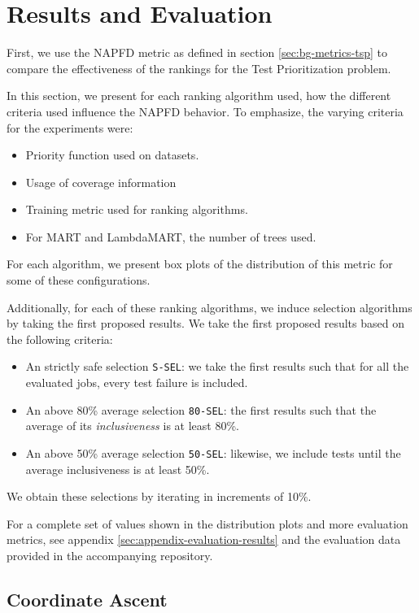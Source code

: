 \chapter{Results and Evaluation}\label{s:results}

First, we use the NAPFD metric as defined in section \ref{sec:bg-metrics-tsp} to compare the effectiveness of the 
rankings for the Test Prioritization problem.

In this section, we present for each ranking algorithm used, how the different criteria used influence the
NAPFD behavior. To emphasize, the varying criteria for the experiments were:
\begin{itemize}
    \item Priority function used on datasets.
    \item Usage of coverage information
    \item Training metric used for ranking algorithms.
    \item For MART and LambdaMART, the number of trees used.
\end{itemize}

For each algorithm, we present box plots of the distribution of this metric for some of these configurations. 

Additionally, for each of these ranking algorithms, we induce selection algorithms by taking the first proposed
results. We take the first proposed results based on the following criteria:
\begin{itemize}
    \item An strictly safe selection \texttt{S-SEL}: we take the first results such that for all the evaluated jobs, every 
    test failure is included.
    \item An above 80\% average selection \texttt{80-SEL}: the first results such that the average of its \emph{inclusiveness}
    is at least 80\%.
    \item An above 50\% average selection \texttt{50-SEL}: likewise, we include tests until the average inclusiveness is at least 50\%.
\end{itemize}

We obtain these selections by iterating in increments of 10\%.

For a complete set of values shown in the distribution plots and more evaluation metrics, see appendix \ref{sec:appendix-evaluation-results}
and the evaluation data provided in the accompanying repository.

\section{Coordinate Ascent}

